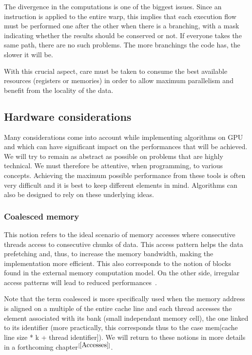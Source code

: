 The divergence in the computations is one of the biggest issues. Since an instruction is applied to the entire warp, this implies that each execution flow must be performed one after the other when there is a branching, with a mask indicating whether the results should be conserved or not. If everyone takes the same path, there are no such problems. The more branchings the code has, the slower it will be.

With this crucial aspect, care must be taken to consume the best available resources (registers or memories) in order to allow maximum parallelism and benefit from the locality of the data.

\subsection{Hardware considerations}

Many considerations come into account while implementing algorithms on GPU and which can have significant impact on the performances that will be achieved. We will try to remain as abstract as possible on problems that are highly technical. We must therefore be attentive, when programming, to various concepts. Achieving the maximum possible performance from these tools is often very difficult and it is best to keep different elements in mind. Algorithms can also be designed to rely on these underlying ideas.

\subsubsection{Coalesced memory}

This notion refers to the ideal scenario of memory accesses where consecutive threads access to consecutive chunks of data. This access pattern helps the data prefetching and, thus, to increase the memory bandwidth, making the implementation more efficient. This also corresponds to the notion of blocks found in the external memory computation model. On the other side, irregular access patterns will lead to reduced performances~\cite{baskaran2008optimizing}.

Note that the term coalesced is more specifically used when the memory address is aligned on a multiple of the entire cache line and each thread accesses the element associated with its bank (small independant memory cell), the one linked to its identifier (more practically, this corresponds thus to the case mem[cache line size * k + thread identifier]). We will return to these notions in more details in a forthcoming chapter$^{[\ref{Accesses}]}$.

